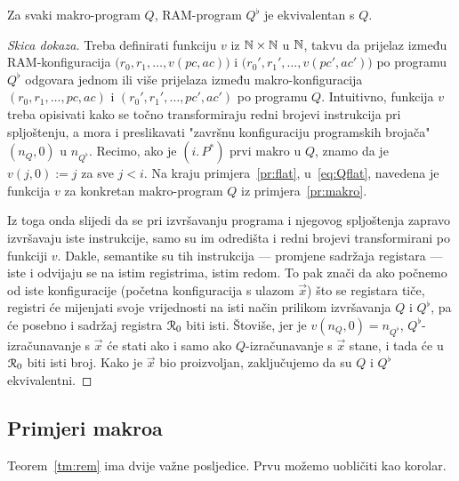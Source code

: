 \begin{teorem}[{name=[ekvivalentnost programa i njegovog spljoštenja]}]\label{tm:rem}
Za svaki makro-program $Q$, RAM-program $Q^\flat$ je ekvivalentan s $Q$.
\end{teorem}
\begin{proof}[Skica dokaza]
Treba definirati funkciju $v$ iz ${\mathbb N}\times{\mathbb N}$ u ${\mathbb N}$, takvu da prijelaz između RAM-konfiguracija $\bigl(r_0,r_1,\dotsc,v(pc,ac)\bigr)$ i $\bigl(r_0',r_1',\dotsc,v(pc',ac')\bigr)$ po programu $Q^\flat$ odgovara jednom ili više prijelaza između makro-konfiguracija $(r_0,r_1,\dotsc,pc,ac)$ i $(r_0',r_1',\dotsc,pc',ac')$ po programu $Q$. Intuitivno, funkcija $v$ treba opisivati kako se točno transformiraju redni brojevi instrukcija pri spljoštenju, a mora i preslikavati "završnu konfiguraciju programskih brojača" $(n_Q,0)$ u $n_{Q^\flat}$. Recimo, ako je $(i.\,P^*)$ prvi makro u $Q$, znamo da je $v(j,0):=j$ za sve $j<i$. Na kraju primjera~\ref{pr:flat}, u~\eqref{eq:Qflat}, navedena je funkcija $v$ za konkretan makro-program $Q$ iz primjera~\ref{pr:makro}.

Iz toga onda slijedi da se pri izvršavanju programa i njegovog spljoštenja zapravo izvršavaju iste instrukcije, samo su im odredišta i redni brojevi transformirani po funkciji $v$. Dakle, semantike su tih instrukcija --- promjene sadržaja registara --- iste i odvijaju se na istim registrima, istim redom. To pak znači da ako počnemo od iste konfiguracije (početna konfiguracija s ulazom $\vec x$) što se registara tiče, registri će mijenjati svoje vrijednosti na isti način prilikom izvršavanja $Q$ i $Q^\flat$, pa će posebno i sadržaj registra $\mathcal R_{0}$ biti isti. Štoviše, jer je $v(n_Q,0)=n_{Q^\flat}$, $Q^\flat$-izračunavanje s $\vec x$ će stati ako i samo ako $Q$-izračunavanje s $\vec x$ stane, i tada će u $\mathcal R_{0}$ biti isti broj. Kako je $\vec x$ bio proizvoljan, zaključujemo da su $Q$ i $Q^\flat$ ekvivalentni.
\end{proof}

\subsection{Primjeri makroa}
Teorem~\ref{tm:rem} ima dvije važne posljedice. Prvu možemo uobličiti kao korolar.

